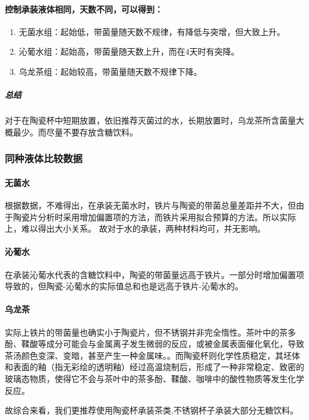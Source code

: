\documentclass[12pt,a4paper]{ctexart}
\begin{document}
\paragraph{控制承装液体相同，天数不同，可以得到：}
\begin{enumerate}
    \item 无菌水组：起始低，带菌量随天数不规律，有降低与突增，但大致上升。
    \item 沁葡水组：起始高，带菌量随天数上升，而在4天时有突降。
    \item 乌龙茶组：起始较高，带菌量随天数不规律下降。
\end{enumerate}
\subparagraph{总结}
对于在陶瓷杯中短期放置\cite{YXWX201209015}，依旧推荐灭菌过的水，长期放置时，乌龙茶所含菌量大概最少。而尽量不要存放含糖饮料。

\subsubsection{同种液体比较数据}
\paragraph{无菌水}

根据数据，不难得出，在承装无菌水时，铁片与陶瓷的带菌总量差距并不大，但由于陶瓷片分析时采用增加偏置项的方法，而铁片采用拟合预算的方法。所以实际上，难以得出大小关系。
故对于水的承装，两种材料均可，并无影响。


\paragraph{沁葡水}
在承装沁葡水代表的含糖饮料中，陶瓷的带菌量远高于铁片。\cite{1013165979.nh}\cite{GNCL200603020}\cite{GYYX199305057}一部分时增加偏置项导致的，但陶瓷-沁葡水的实际值总和也是远高于铁片-沁葡水的。\cite{XFZB20041203A032}

\paragraph{乌龙茶}
实际上铁片的带菌量也确实小于陶瓷片\cite{JSHJ201504002}，但不锈钢并非完全惰性。茶叶中的茶多酚、\cite{HXSJ202002001}鞣酸等成分可能会与金属离子发生微弱的反应，或被金属表面催化氧化，导致茶汤颜色变深、变暗，甚至产生一种金属味。\cite{JSHJ201504002}。而陶瓷杯则化学性质稳定，其坯体和表面的釉（指无彩绘的透明釉）经过高温烧制后，形成了一种非常稳定、致密的玻璃态物质，使得它不会与茶叶中的茶多酚、鞣酸、咖啡中的酸性物质等发生化学反应。 

故综合来看，我们更推荐使用陶瓷杯承装茶类,\cite{2002051717.nh}不锈钢杯子承装大部分无糖饮料。
\end{document}

